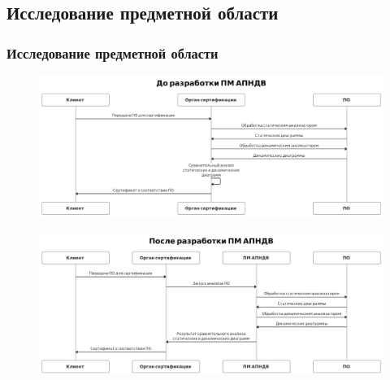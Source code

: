 \subsection{Исследование предметной области}
\begin{frame}
\frametitle{Исследование предметной области}
    \vspace{-2ex} 
    \begin{figure}[!htbp]
        \includegraphics[width=\textwidth,height=\textheight,keepaspectratio]{images/uml_before_cropped.png}
    \end{figure}
    \begin{figure}[!htbp]
    \vspace{-2.7ex} 
        \includegraphics[width=\textwidth,height=\textheight,keepaspectratio]{images/uml_after_cropped.png}
    \end{figure}
%

\end{frame}
